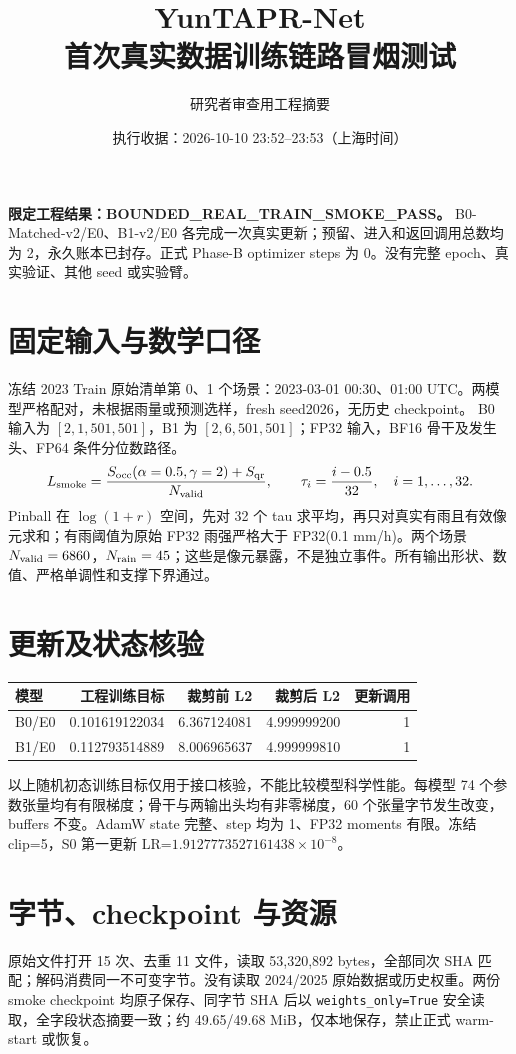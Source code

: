 \documentclass[UTF8,a4paper,11pt]{ctexart}
\title{YunTAPR-Net\\首次真实数据训练链路冒烟测试}
\author{研究者审查用工程摘要}
\date{执行收据：2026-10-10 23:52--23:53（上海时间）}
\begin{document}
\pagestyle{plain}
\maketitle
\vspace{-12mm}
\textbf{限定工程结果：BOUNDED\_REAL\_TRAIN\_SMOKE\_PASS。}
B0-Matched-v2/E0、B1-v2/E0 各完成一次真实更新；预留、进入和返回调用总数均为 2，永久账本已封存。正式 Phase-B optimizer steps 为 0。没有完整 epoch、真实验证、其他 seed 或实验臂。

\section*{固定输入与数学口径}
冻结 2023 Train 原始清单第 0、1 个场景：2023-03-01 00:30、01:00 UTC。两模型严格配对，未根据雨量或预测选样，fresh seed2026，无历史 checkpoint。
B0 输入为 $[2,1,501,501]$，B1 为 $[2,6,501,501]$；FP32 输入，BF16 骨干及发生头、FP64 条件分位数路径。
\[
L_{\rm smoke}=\frac{S_{\rm occ}(\alpha=0.5,\gamma=2)+S_{\rm qr}}{N_{\rm valid}},
\qquad \tau_i=\frac{i-0.5}{32},\quad i=1,\ldots,32.
\]
Pinball 在 $\log(1+r)$ 空间，先对 32 个 tau 求平均，再只对真实有雨且有效像元求和；有雨阈值为原始 FP32 雨强严格大于 FP32(0.1 mm/h)。两个场景 $N_{\rm valid}=6860$，$N_{\rm rain}=45$；这些是像元暴露，不是独立事件。所有输出形状、数值、严格单调性和支撑下界通过。

\section*{更新及状态核验}
\begin{center}
\begin{tabular}{lrrrr}
\toprule
模型 & 工程训练目标 & 裁剪前 L2 & 裁剪后 L2 & 更新调用\\
\midrule
B0/E0 & 0.101619122034 & 6.367124081 & 4.999999200 & 1\\
B1/E0 & 0.112793514889 & 8.006965637 & 4.999999810 & 1\\
\bottomrule
\end{tabular}
\end{center}
以上随机初态训练目标仅用于接口核验，不能比较模型科学性能。每模型 74 个参数张量均有有限梯度；骨干与两输出头均有非零梯度，60 个张量字节发生改变，buffers 不变。AdamW state 完整、step 均为 1、FP32 moments 有限。冻结 clip=5，S0 第一更新 LR=$1.9127773527161438\times10^{-8}$。

\clearpage
\section*{字节、checkpoint 与资源}
原始文件打开 15 次、去重 11 文件，读取 53,320,892 bytes，全部同次 SHA 匹配；解码消费同一不可变字节。没有读取 2024/2025 原始数据或历史权重。两份 smoke checkpoint 均原子保存、同字节 SHA 后以 \texttt{weights\_only=True} 安全读取，全字段状态摘要一致；约 49.65/49.68 MiB，仅本地保存，禁止正式 warm-start 或恢复。
\end{document}
